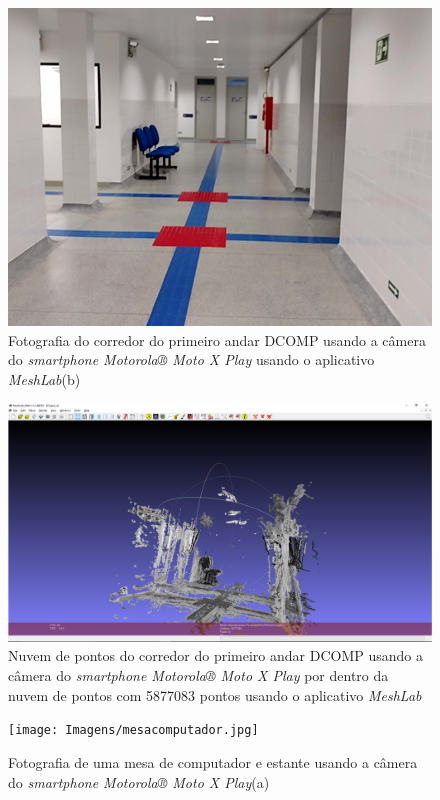 \begin{figure}[H]
	\centering
		\includegraphics[width= \textwidth]{Imagens/scene04910.jpg}
	\caption{Fotografia do corredor do primeiro andar DCOMP usando a câmera do \textit{smartphone Motorola® Moto X Play} usando o aplicativo \textit{MeshLab}(b)}
\end{figure}

\begin{figure}[H]
	\centering
		\includegraphics[width= \textwidth]{Imagens/corredorMotoxdentro.PNG}
	\caption{Nuvem de pontos do corredor do primeiro andar DCOMP usando a câmera do \textit{smartphone Motorola® Moto X Play} por dentro da nuvem de pontos com 5877083 pontos usando o aplicativo \textit{MeshLab}}
\end{figure}


\begin{figure}[H]
	\centering
		\texttt{[image: Imagens/mesacomputador.jpg]}
	\caption{Fotografia de uma mesa de computador e estante usando a câmera do  \textit{smartphone Motorola® Moto X Play}(a)}
\end{figure}

